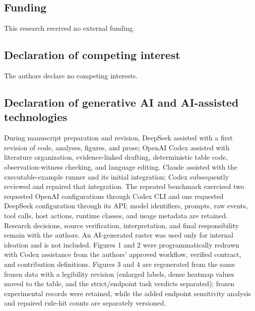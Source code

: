 \subsection*{Funding}

This research received no external funding.

\subsection*{Declaration of competing interest}

The authors declare no competing interests.

\subsection*{Declaration of generative AI and AI-assisted technologies}

During manuscript preparation and revision, DeepSeek assisted with a first revision of code, analyses, figures, and prose; OpenAI Codex assisted with literature organization, evidence-linked drafting, deterministic table code, observation-witness checking, and language editing. Claude assisted with the executable-example runner and its initial integration; Codex subsequently reviewed and repaired that integration. The repeated benchmark exercised two requested OpenAI configurations through Codex CLI and one requested DeepSeek configuration through its API; model identifiers, prompts, raw events, tool calls, host actions, runtime classes, and usage metadata are retained. Research decisions, source verification, interpretation, and final responsibility remain with the authors. An AI-generated raster was used only for internal ideation and is not included. Figures 1 and 2 were programmatically redrawn with Codex assistance from the authors' approved workflow, verified contract, and contribution definitions. Figures 3 and 4 are regenerated from the same frozen data with a legibility revision (enlarged labels, dense heatmap values moved to the table, and the strict/endpoint task verdicts separated); frozen experimental records were retained, while the added endpoint sensitivity analysis and repaired rule-hit counts are separately versioned.

